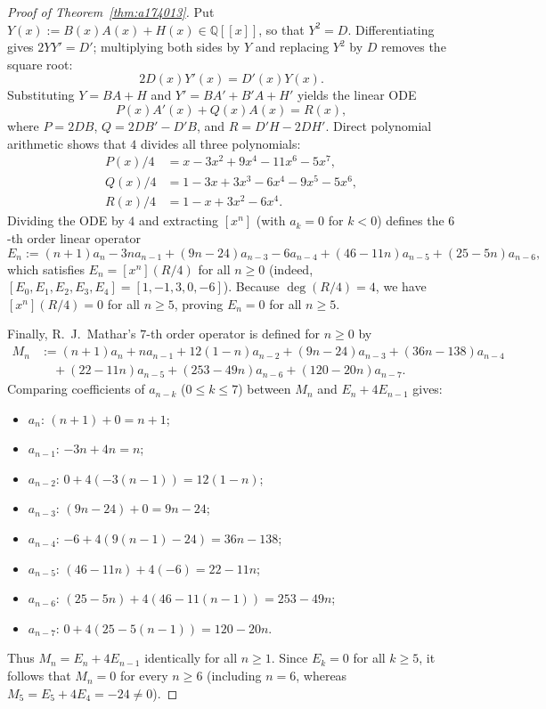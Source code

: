 \documentclass[11pt,a4paper]{article}
\theoremstyle{definition}
\theoremstyle{remark}
\newcommand{\Q}{\mathbb{Q}}
\begin{document}
\begin{proof}[Proof of Theorem~\ref{thm:a174013}]
Put $Y(x) := B(x) A(x) + H(x) \in \Q[[x]]$, so that $Y^2 = D$. Differentiating gives $2 Y Y' = D'$; multiplying both sides by $Y$ and replacing $Y^2$ by $D$ removes the square root:
\[
  2 D(x) Y'(x) = D'(x) Y(x).
\]
Substituting $Y = B A + H$ and $Y' = B A' + B' A + H'$ yields the linear ODE
\[
  P(x) A'(x) + Q(x) A(x) = R(x),
\]
where $P = 2 D B$, $Q = 2 D B' - D' B$, and $R = D' H - 2 D H'$. Direct polynomial arithmetic shows that $4$ divides all three polynomials:
\begin{align*}
  P(x)/4 &= x - 3x^2 + 9x^4 - 11x^6 - 5x^7, \\
  Q(x)/4 &= 1 - 3x + 3x^3 - 6x^4 - 9x^5 - 5x^6, \\
  R(x)/4 &= 1 - x + 3x^2 - 6x^4.
\end{align*}
Dividing the ODE by $4$ and extracting $[x^n]$ (with $a_k = 0$ for $k < 0$) defines the $6$-th order linear operator
\[
  E_n := (n+1)a_n - 3na_{n-1} + (9n-24)a_{n-3} - 6a_{n-4} + (46-11n)a_{n-5} + (25-5n)a_{n-6},
\]
which satisfies $E_n = [x^n](R/4)$ for all $n \ge 0$ (indeed, $[E_0,E_1,E_2,E_3,E_4] = [1,-1,3,0,-6]$). Because $\deg(R/4) = 4$, we have $[x^n](R/4) = 0$ for all $n \ge 5$, proving $E_n = 0$ for all $n \ge 5$.

Finally, R.~J.~Mathar's $7$-th order operator is defined for $n \ge 0$ by
\begin{align*}
  M_n &:= (n+1)a_n + na_{n-1} + 12(1-n)a_{n-2} + (9n-24)a_{n-3} + (36n-138)a_{n-4} \\
      &\quad + (22-11n)a_{n-5} + (253-49n)a_{n-6} + (120-20n)a_{n-7}.
\end{align*}
Comparing coefficients of $a_{n-k}$ ($0 \le k \le 7$) between $M_n$ and $E_n + 4 E_{n-1}$ gives:
\begin{itemize}
  \item $a_n$: $(n+1) + 0 = n+1$;
  \item $a_{n-1}$: $-3n + 4n = n$;
  \item $a_{n-2}$: $0 + 4(-3(n-1)) = 12(1-n)$;
  \item $a_{n-3}$: $(9n-24) + 0 = 9n-24$;
  \item $a_{n-4}$: $-6 + 4(9(n-1)-24) = 36n - 138$;
  \item $a_{n-5}$: $(46-11n) + 4(-6) = 22 - 11n$;
  \item $a_{n-6}$: $(25-5n) + 4(46-11(n-1)) = 253 - 49n$;
  \item $a_{n-7}$: $0 + 4(25-5(n-1)) = 120 - 20n$.
\end{itemize}
Thus $M_n = E_n + 4 E_{n-1}$ identically for all $n \ge 1$. Since $E_k = 0$ for all $k \ge 5$, it follows that $M_n = 0$ for every $n \ge 6$ (including $n = 6$, whereas $M_5 = E_5 + 4 E_4 = -24 \ne 0$).
\end{proof}
\end{document}
